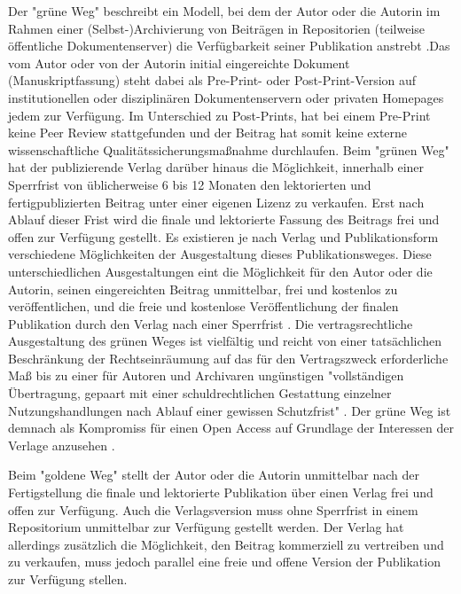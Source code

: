 Der "grüne Weg" beschreibt ein Modell, bei dem der Autor oder die Autorin im Rahmen einer (Selbst-)Archivierung von Beiträgen in Repositorien (teilweise öffentliche Dokumentenserver) die Verfügbarkeit seiner Publikation anstrebt \cite{brembs2015open} \cite{muller_2010_open} \cite{grand_2012_open}.Das vom Autor oder von der Autorin initial eingereichte Dokument (Manuskriptfassung) steht dabei als Pre-Print- oder Post-Print-Version auf institutionellen oder disziplinären Dokumentenservern oder privaten Homepages jedem zur Verfügung. Im Unterschied zu Post-Prints, hat bei einem Pre-Print keine Peer Review stattgefunden und der Beitrag hat somit keine externe wissenschaftliche Qualitätssicherungsmaßnahme durchlaufen. Beim "grünen Weg" hat der publizierende Verlag darüber hinaus die Möglichkeit, innerhalb einer Sperrfrist von üblicherweise 6 bis 12 Monaten den lektorierten und fertigpublizierten Beitrag unter einer eigenen Lizenz zu verkaufen. Erst nach Ablauf dieser Frist wird die finale und lektorierte Fassung des Beitrags frei und offen zur Verfügung gestellt. Es existieren je nach Verlag und Publikationsform verschiedene Möglichkeiten der Ausgestaltung dieses Publikationsweges. Diese unterschiedlichen Ausgestaltungen eint die Möglichkeit für den Autor oder die Autorin, seinen eingereichten Beitrag unmittelbar, frei und kostenlos zu veröffentlichen, und die freie und kostenlose Veröffentlichung der finalen Publikation durch den Verlag nach einer Sperrfrist \cite{dorschel_2006_open}. Die vertragsrechtliche Ausgestaltung des grünen Weges ist vielfältig und reicht von einer tatsächlichen Beschränkung der Rechtseinräumung auf das für den Vertragszweck erforderliche Maß bis zu einer für Autoren und Archivaren ungünstigen "vollständigen Übertragung, gepaart mit einer schuldrechtlichen Gestattung einzelner Nutzungshandlungen nach Ablauf einer gewissen Schutzfrist" \cite{dorschel_2006_open}. Der grüne Weg ist demnach als Kompromiss für einen Open Access auf Grundlage der Interessen der Verlage anzusehen \cite{Mussell_2013}.

Beim "goldene Weg" stellt der Autor oder die Autorin unmittelbar nach der Fertigstellung die finale und lektorierte Publikation über einen Verlag frei und offen zur Verfügung. Auch die Verlagsversion muss ohne Sperrfrist in einem Repositorium unmittelbar zur Verfügung gestellt werden. Der Verlag hat allerdings zusätzlich die Möglichkeit, den Beitrag kommerziell zu vertreiben und zu verkaufen, muss jedoch parallel eine freie und offene Version der Publikation zur Verfügung stellen.

